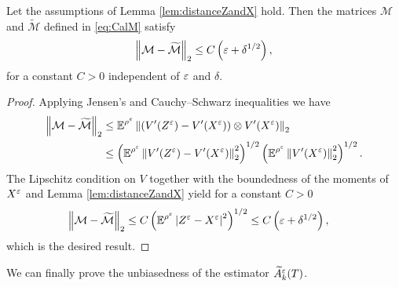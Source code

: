 \documentclass[10pt]{article}
\begin{document}
\begin{appendices}
\begin{lemma}\label{lem:distanceMandTildeM} Let the assumptions of Lemma \ref{lem:distanceZandX} hold. Then the matrices $\mathcal M$ and $\widetilde{\mathcal M}$ defined in \eqref{eq:CalM} satisfy
	\begin{equation}
	\left\|\mathcal M - \widetilde{\mathcal M}\right\|_2 \leq C\left(\varepsilon + \delta^{1/2}\right),
	\end{equation}
	for a constant $C > 0$ independent of $\varepsilon$ and $\delta$.
\end{lemma}
\begin{proof} Applying Jensen's and Cauchy--Schwarz inequalities we have
	\begin{equation}
	\begin{aligned}
	\left\|\mathcal M - \widetilde{\mathcal M}\right\|_2 &\leq \operatorname{\mathbb{E}}^{\rho^\varepsilon} \left\|\left(V'(Z^\varepsilon) - V'(X^\varepsilon)\right) \otimes V'(X^\varepsilon)\right\|_2 \\
	&\leq \left(\operatorname{\mathbb{E}}^{\rho^\varepsilon}\left\|V'(Z^\varepsilon) - V'(X^\varepsilon)\right\|_2^2\right)^{1/2} \left(\operatorname{\mathbb{E}}^{\rho^\varepsilon} \left\|V'(X^\varepsilon)\right\|_2^{2}\right)^{1/2}.
	\end{aligned}
	\end{equation}
	The Lipschitz condition on $V$ together with the boundedness of the moments of $X^\varepsilon$ and Lemma \ref{lem:distanceZandX} yield for a constant $C > 0$
	\begin{equation}
	\begin{aligned}
	\left\|\mathcal M - \widetilde{\mathcal M}\right\|_2 &\leq C\left(\operatorname{\mathbb{E}}^{\rho^\varepsilon}\left\lvert Z^\varepsilon - X^\varepsilon\right\rvert^{2}\right)^{1/2} \leq C \left(\varepsilon + \delta^{1/2} \right),
	\end{aligned}
	\end{equation}
	which is the desired result.
\end{proof}

We can finally prove the unbiasedness of the estimator $\widetilde A^\varepsilon_k(T)$.



\end{appendices}
\end{document}
